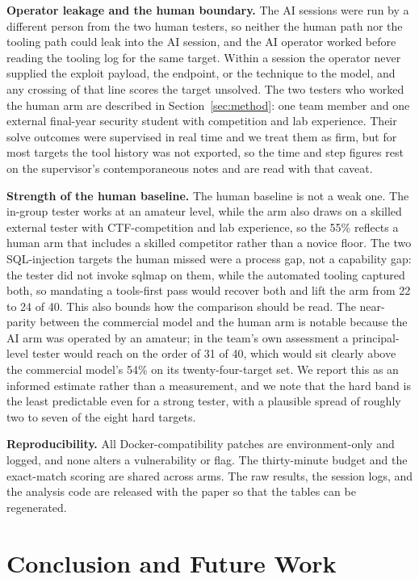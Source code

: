 \documentclass[conference]{IEEEtran}
\begin{document}
\textbf{Operator leakage and the human boundary.}
The AI sessions were run by a different person from the two human testers, so neither the human path nor the tooling path could leak into the AI session, and the AI operator worked before reading the tooling log for the same target. Within a session the operator never supplied the exploit payload, the endpoint, or the technique to the model, and any crossing of that line scores the target unsolved. The two testers who worked the human arm are described in Section~\ref{sec:method}: one team member and one external final-year security student with competition and lab experience. Their solve outcomes were supervised in real time and we treat them as firm, but for most targets the tool history was not exported, so the time and step figures rest on the supervisor's contemporaneous notes and are read with that caveat.

\textbf{Strength of the human baseline.}
The human baseline is not a weak one. The in-group tester works at an amateur level, while the arm also draws on a skilled external tester with CTF-competition and lab experience, so the 55\% reflects a human arm that includes a skilled competitor rather than a novice floor. The two SQL-injection targets the human missed were a process gap, not a capability gap: the tester did not invoke sqlmap on them, while the automated tooling captured both, so mandating a tools-first pass would recover both and lift the arm from 22 to 24 of 40. This also bounds how the comparison should be read. The near-parity between the commercial model and the human arm is notable because the AI arm was operated by an amateur; in the team's own assessment a principal-level tester would reach on the order of 31 of 40, which would sit clearly above the commercial model's 54\% on its twenty-four-target set. We report this as an informed estimate rather than a measurement, and we note that the hard band is the least predictable even for a strong tester, with a plausible spread of roughly two to seven of the eight hard targets.

\textbf{Reproducibility.}
All Docker-compatibility patches are environment-only and logged, and none alters a vulnerability or flag. The thirty-minute budget and the exact-match scoring are shared across arms. The raw results, the session logs, and the analysis code are released with the paper so that the tables can be regenerated.

\section{Conclusion and Future Work}
\end{document}
